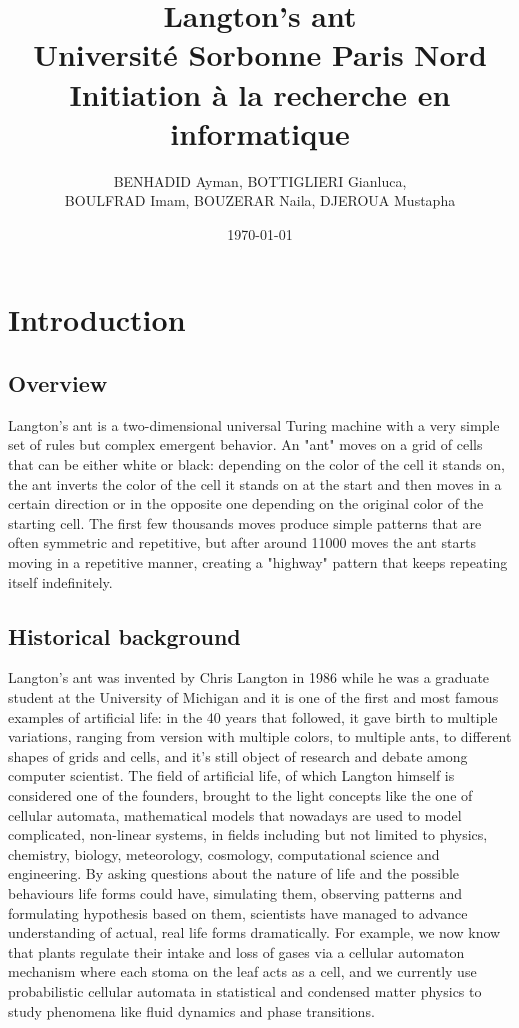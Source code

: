 \documentclass{article}
\title{Langton's ant \\  \LARGE Université Sorbonne Paris Nord \\ \large Initiation à la recherche en informatique}
\author{BENHADID Ayman, BOTTIGLIERI Gianluca, \\ BOULFRAD Imam, BOUZERAR Naila,  DJEROUA Mustapha}
\date{\today}
\begin{document}
\maketitle

\newpage

\tableofcontents

\newpage

\tableofcontents

\section{Introduction}
\subsection{Overview}
Langton's ant is a two-dimensional universal Turing machine with a very simple set of rules but complex emergent behavior. 
An "ant" moves on a grid of cells that can be either white or black: depending on the color of the cell it stands on, the ant 
inverts the color of the cell it stands on at the start and then moves in a certain direction or in the opposite one depending
on the original color of the starting cell. 
The first few thousands moves produce simple patterns that are often symmetric and repetitive, but after around 11000 moves 
the ant starts moving in a repetitive manner, creating a "highway" pattern that keeps repeating itself indefinitely.

\subsection{Historical background}
Langton's ant was invented by Chris Langton in 1986 while he was a graduate student at the University of Michigan and it is one of the first 
and most famous examples of artificial life: in the 40 years that followed, it gave birth to multiple  variations, ranging from version with 
multiple colors, to multiple ants, to different shapes of grids and cells, and it's still object of research and debate among computer scientist.
The field of artificial life, of which Langton himself is considered one of the founders, brought to the light concepts like 
the one of cellular automata, mathematical models that nowadays are used to model complicated, non-linear systems, in fields including but not limited to physics,
chemistry, biology, meteorology, cosmology, computational science and engineering. By asking questions about the nature of life and the possible
behaviours life forms could have, simulating them, observing patterns and formulating hypothesis based on them, scientists have managed to 
advance understanding of actual, real life forms dramatically. For example, we now know that plants regulate their intake and loss of gases 
via a cellular automaton mechanism where each stoma on the leaf acts as a cell, and we currently use probabilistic cellular automata 
in statistical and condensed matter physics to study phenomena like fluid dynamics and phase transitions.
\end{document}
